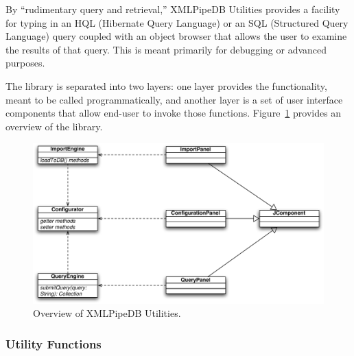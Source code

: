 \documentclass[11pt]{article}
\begin{document}
By ``rudimentary query and retrieval,'' XMLPipeDB Utilities provides a facility for typing in an HQL (Hibernate Query Language) or an SQL (Structured Query Language) query coupled with an object browser that allows the user to examine the results of that query.  This is meant primarily for debugging or advanced purposes.

The library is separated into two layers: one layer provides the functionality, meant to be called programmatically, and another layer is a set of user interface components that allow end-user to invoke those functions.  Figure~\ref{utils} provides an overview of the library.

\begin{figure}[htbp] %
   \centering
   \includegraphics[width=5in]{figures/xmlpipedb-utilities.pdf} 
   \caption{Overview of XMLPipeDB Utilities.}
   \label{utils}
\end{figure}

\subsubsection{Utility Functions}
\end{document}

